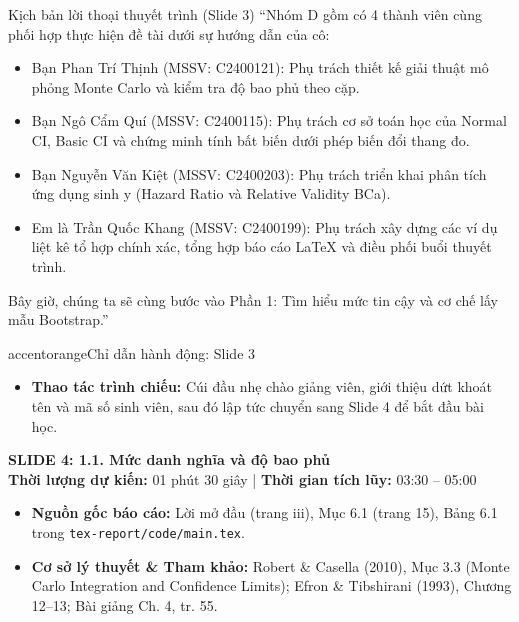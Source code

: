 \documentclass[10pt,a4paper]{article}
\newcommand{\slideheader}[4]{
    \vspace{0.4cm}
    \begin{tcolorbox}[colback=primary!7!white, colframe=primary, arc=2mm, boxrule=1pt, left=4mm, right=4mm, top=2.5mm, bottom=2.5mm]
        {\Large\bfseries\color{primary} SLIDE #1: #2}\\[0.1cm]
        {\small\textbf{Thời lượng dự kiến:} #3 \quad | \quad \textbf{Thời gian tích lũy:} #4}
    \end{tcolorbox}
    \vspace{0.15cm}
}
\begin{document}
\begin{scriptbox}{Kịch bản lời thoại thuyết trình (Slide 3)}
    ``Nhóm D gồm có 4 thành viên cùng phối hợp thực hiện đề tài dưới sự hướng dẫn của cô:
    \begin{itemize}
        \item Bạn Phan Trí Thịnh (MSSV: C2400121): Phụ trách thiết kế giải thuật mô phỏng Monte Carlo và kiểm tra độ bao phủ theo cặp.
        \item Bạn Ngô Cẩm Quí (MSSV: C2400115): Phụ trách cơ sở toán học của Normal CI, Basic CI và chứng minh tính bất biến dưới phép biến đổi thang đo.
        \item Bạn Nguyễn Văn Kiệt (MSSV: C2400203): Phụ trách triển khai phân tích ứng dụng sinh y (Hazard Ratio và Relative Validity BCa).
        \item Em là Trần Quốc Khang (MSSV: C2400199): Phụ trách xây dựng các ví dụ liệt kê tổ hợp chính xác, tổng hợp báo cáo LaTeX và điều phối buổi thuyết trình.
    \end{itemize}
    Bây giờ, chúng ta sẽ cùng bước vào Phần 1: Tìm hiểu mức tin cậy và cơ chế lấy mẫu Bootstrap.''
\end{scriptbox}

\begin{actionbox}{accentorange}{Chỉ dẫn hành động: Slide 3}
    \begin{itemize}
        \item \textbf{Thao tác trình chiếu:} Cúi đầu nhẹ chào giảng viên, giới thiệu dứt khoát tên và mã số sinh viên, sau đó lập tức chuyển sang Slide 4 để bắt đầu bài học.
    \end{itemize}
\end{actionbox}

\newpage

\slideheader{4}{1.1. Mức danh nghĩa và độ bao phủ}{01 phút 30 giây}{03:30 -- 05:00}

\begin{itemize}
    \item \textbf{Nguồn gốc báo cáo:} Lời mở đầu (trang iii), Mục 6.1 (trang 15), Bảng 6.1 trong \texttt{tex-report/code/main.tex}.
    \item \textbf{Cơ sở lý thuyết \& Tham khảo:} Robert \& Casella (2010), Mục 3.3 (Monte Carlo Integration and Confidence Limits); Efron \& Tibshirani (1993), Chương 12--13; Bài giảng Ch. 4, tr. 55.
\end{itemize}
\end{document}
